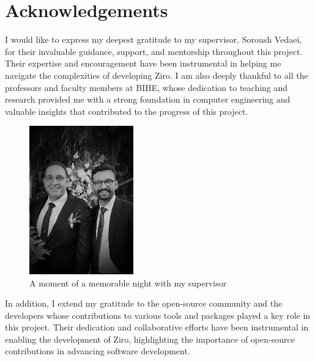 \section{Acknowledgements}

I would like to express my deepest gratitude to my supervisor, Soroush Vedaei, for their invaluable guidance, support, and mentorship throughout this project. Their expertise and encouragement have been instrumental in helping me navigate the complexities of developing Ziro. I am also deeply thankful to all the professors and faculty members at BIHE, whose dedication to teaching and research provided me with a strong foundation in computer engineering and valuable insights that contributed to the progress of this project.

\vspace{2em}

\begin{figure}[H]
	\centering
	\includegraphics[width=0.4\textwidth]{Supervisor.jpg}
	\caption{A moment of a memorable night with my supervisor}
	\label{fig:supervisor}
\end{figure}

\vspace{2em}

In addition, I extend my gratitude to the open-source community and the developers whose contributions to various tools and packages played a key role in this project. Their dedication and collaborative efforts have been instrumental in enabling the development of Ziro, highlighting the importance of open-source contributions in advancing software development.














\pagebreak
